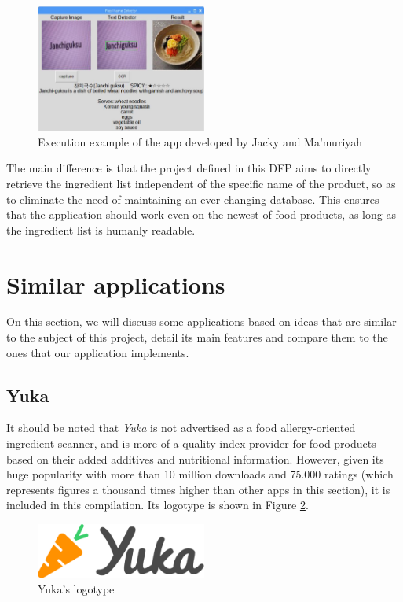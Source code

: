 \begin{figure}[h]
  \centering
  \includegraphics[width=0.5\textwidth]{Figures/jacky.png}
  \caption{%
    Execution example of the app developed by Jacky and Ma'muriyah
  }
  \label{fig:jacky}
\end{figure}

The main difference is that the project defined in this DFP aims to directly retrieve the ingredient list independent of the specific name of the product, so as to eliminate the need of maintaining an ever-changing database. This ensures that the application should work even on the newest of food products, as long as the ingredient list is humanly readable.

\section{Similar applications}

On this section, we will discuss some applications based on ideas that are similar to the subject of this project, detail its main features and compare them to the ones that our application implements.

\subsection{Yuka}

It should be noted that \textit{Yuka} \cite{noauthor_yuka_nodate-1} is not advertised as a food allergy-oriented ingredient scanner, and is more of a quality index provider for food products based on their added additives and nutritional information. However, given its huge popularity with more than 10 million downloads and 75.000 ratings \cite{noauthor_yuka_nodate} (which represents figures a thousand times higher than other apps in this section), it is included in this compilation. Its logotype is shown in Figure \ref{fig:yuka}.

\begin{figure}[h]
  \centering
  \includegraphics[width=0.5\textwidth]{Figures/yuka.png}
  \caption{%
    Yuka's logotype
  }
  \label{fig:yuka}
\end{figure}

